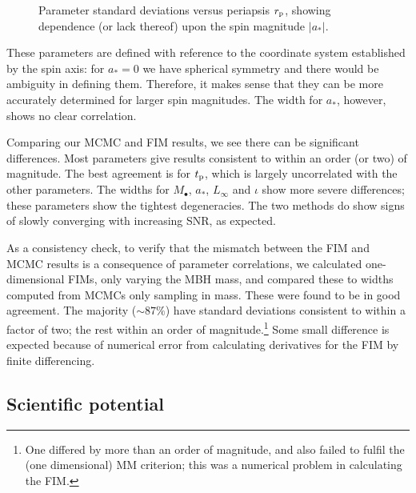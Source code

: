 \begin{figure}
\begin{center}
\caption{Parameter standard deviations versus periapsis $r_\mathrm{p}$, showing dependence (or lack thereof) upon the spin magnitude $|a_\ast|$.\label{fig:sigmas-spin}}
\end{center}
\end{figure}
These parameters are defined with reference to the coordinate system established by the spin axis: for $a_\ast = 0$ we have spherical symmetry and there would be ambiguity in defining them. Therefore, it makes sense that they can be more accurately determined for larger spin magnitudes. The width for $a_\ast$, however, shows no clear correlation.

Comparing our MCMC and FIM results, we see there can be significant differences. Most parameters give results consistent to within an order (or two) of magnitude. The best agreement is for $t_\mathrm{p}$, which is largely uncorrelated with the other parameters. The widths for $M_\bullet$, $a_\ast$, $L_\infty$ and $\iota$ show more severe differences; these parameters show the tightest degeneracies. The two methods do show signs of slowly converging with increasing SNR, as expected.

As a consistency check, to verify that the mismatch between the FIM and MCMC results is a consequence of parameter correlations, we calculated one-dimensional FIMs, only varying the MBH mass, and compared these to widths computed from MCMCs only sampling in mass. These were found to be in good agreement. The majority ($\sim 87\%$) have standard deviations consistent to within a factor of two; the rest within an order of magnitude.\footnote{One differed by more than an order of magnitude, and also failed to fulfil the (one dimensional) MM criterion; this was a numerical problem in calculating the FIM.} Some small difference is expected because of numerical error from calculating derivatives for the FIM by finite differencing.

\subsection{Scientific potential}

